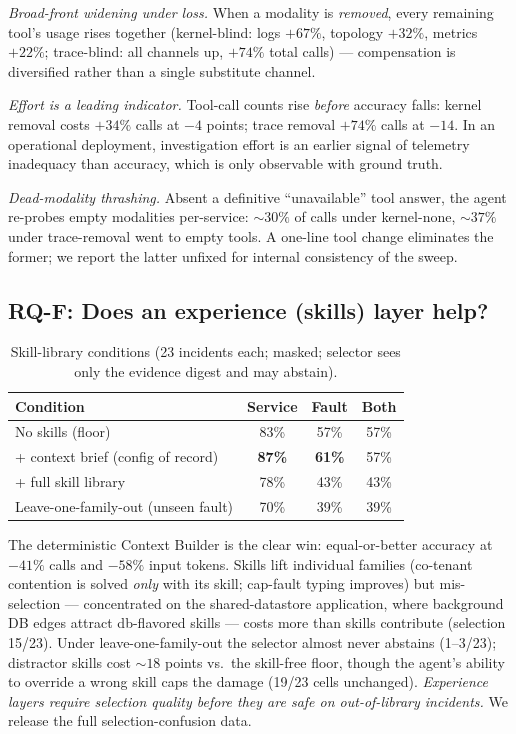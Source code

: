 \emph{Broad-front widening under loss.} When a modality is \emph{removed}, every
remaining tool's usage rises together (kernel-blind: logs $+67\%$, topology $+32\%$,
metrics $+22\%$; trace-blind: all channels up, $+74\%$ total calls) --- compensation
is diversified rather than a single substitute channel.

\emph{Effort is a leading indicator.} Tool-call counts rise \emph{before} accuracy
falls: kernel removal costs $+34\%$ calls at $-4$ points; trace removal $+74\%$ calls
at $-14$. In an operational deployment, investigation effort is an earlier signal of
telemetry inadequacy than accuracy, which is only observable with ground truth.

\emph{Dead-modality thrashing.} Absent a definitive ``unavailable'' tool answer, the
agent re-probes empty modalities per-service: ${\sim}30\%$ of calls under
kernel-none, ${\sim}37\%$ under trace-removal went to empty tools. A one-line tool
change eliminates the former; we report the latter unfixed for internal consistency
of the sweep.

\subsection{RQ-F: Does an experience (skills) layer help?}
\label{sec:results-skills}

\begin{table}[t]
\caption{Skill-library conditions (23 incidents each; masked; selector sees only the
evidence digest and may abstain).}
\label{tab:skills}
\begin{tabular}{lccc}
\toprule
Condition & Service & Fault & Both \\
\midrule
No skills (floor) & 83\% & 57\% & 57\% \\
+ context brief (config of record) & \textbf{87\%} & \textbf{61\%} & 57\% \\
+ full skill library & 78\% & 43\% & 43\% \\
Leave-one-family-out (unseen fault) & 70\% & 39\% & 39\% \\
\bottomrule
\end{tabular}
\end{table}

The deterministic Context Builder is the clear win: equal-or-better accuracy at
$-41\%$ calls and $-58\%$ input tokens. Skills lift individual families (co-tenant
contention is solved \emph{only} with its skill; cap-fault typing improves) but
mis-selection --- concentrated on the shared-datastore application, where background
DB edges attract db-flavored skills --- costs more than skills contribute (selection
15/23). Under leave-one-family-out the selector almost never abstains (1--3/23);
distractor skills cost ${\sim}18$ points vs.\ the skill-free floor, though the agent's
ability to override a wrong skill caps the damage (19/23 cells unchanged).
\emph{Experience layers require selection quality before they are safe on
out-of-library incidents.} We release the full selection-confusion data.

